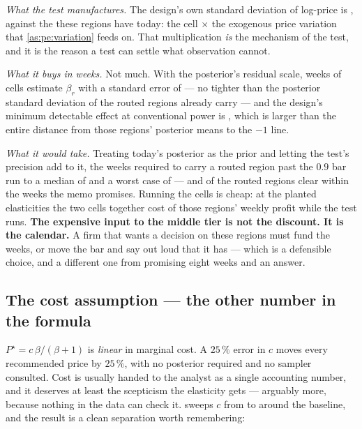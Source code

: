 \emph{What the test manufactures.} The design's own standard deviation of log-price is
\nbThreeTestSdLogp, against the \nbThreeLpSdMed{} these regions have today: the cell
\nbThreeTestSdRatio$\times$ the exogenous price variation that \cref{as:pe:variation} feeds on. That
multiplication \emph{is} the mechanism of the test, and it is the reason a test can settle what
observation cannot.

\emph{What it buys in \nbThreeTestWeeksPlanned{} weeks.} Not much. With the posterior's residual
scale, \nbThreeTestWeeksPlanned{} weeks of cells estimate $\beta_r$ with a standard error of
\nbThreeTestSeBeta{} --- no tighter than the posterior standard deviation of \nbThreeSdRouted{} the
routed regions already carry --- and the design's minimum detectable effect at conventional power is
\nbThreeTestMde, which is larger than the entire distance from those regions' posterior means to the
$-1$ line.

\emph{What it would take.} Treating today's posterior as the prior and letting the test's precision
add to it, the weeks required to carry a routed region past the $0.9$ bar run to a median of
\nbThreeTestWeeks{} and a worst case of \nbThreeTestWeeksWorst{} --- and
\nbThreeNTestClears{} of the \nbThreeNTest{} routed regions clear within the
\nbThreeTestWeeksPlanned{} weeks the memo promises. Running the cells is cheap: at the planted
elasticities the two cells together cost \pc{\nbThreeTestCostPct} of those regions' weekly profit
while the test runs. \textbf{The expensive input to the middle tier is not the discount. It is the
calendar.} A firm that wants a decision on these regions must fund the weeks, or move the bar and
say out loud that it has --- which is a defensible choice, and a different one from promising eight
weeks and an answer.

\subsection*{The cost assumption --- the other number in the formula}



$P^\star = c\,\beta/(\beta+1)$ is \emph{linear} in marginal cost. A $25\,\%$ error in $c$ moves
every recommended price by $25\,\%$, with no posterior required and no sampler consulted. Cost is
usually handed to the analyst as a single accounting number, and it deserves at least the
scepticism the elasticity gets --- arguably more, because nothing in the data can check it.
 sweeps $c$ from \eur{\nbThreeCostLo} to \eur{\nbThreeCostHi} around the
\eur{\nbThreeMarginalCost} baseline, and the result is a clean separation worth remembering:

